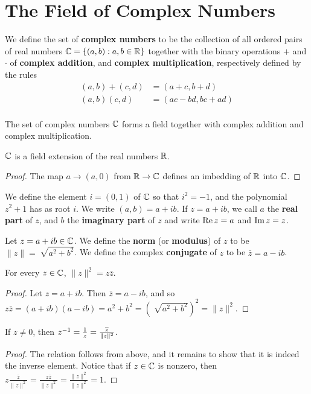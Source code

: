 \section{The Field of Complex Numbers}

\begin{definition}
    We define the set of \textbf{complex numbers} to be the collection of all
    ordered pairs of real numbers $\mathbb{C}=\{(a,b) : a,b \in \mathbb{R}\}$ together with the
    binary operations $+$ and  $\cdot$ of  \textbf{complex addition}, and
    \textbf{complex multiplication}, respectively defined by the rules
    \begin{align*}
        (a,b)+(c,d) &=  (a+c,b+d)   \\
        (a,b)(c,d)  &=  (ac-bd,bc+ad)   \\
    \end{align*}
\end{definition}

\begin{theorem}\label{1.1.1}
    The set of complex numbers $\mathbb{C}$ forms a field together with complex addition
    and complex multiplication.
\end{theorem}
\begin{corollary}
    $\mathbb{C}$ is a field extension of the real numbers $\mathbb{R}$.
\end{corollary}
\begin{proof}
    The map $a \xrightarrow{} (a,0)$ from $\mathbb{R} \xrightarrow{} \mathbb{C}$ defines an
    imbedding of $\mathbb{R}$ into  $\mathbb{C}$.
\end{proof}

\begin{definition}
    We define the element $i=(0,1)$ of $\mathbb{C}$ so that  $i^2=-1$, and the
    polynomial $z^2+1$ has as root $i$. We write $(a,b)=a+ib$. If $z=a+ib$, we
    call  $a$ the  \textbf{real part} of $z$, and  $b$ the  \textbf{imaginary
    part} of $z$ and write  $\operatorname{Re}{z}=a$ and $\operatorname{Im}{z}=z$.
\end{definition}

\begin{definition}
    Let $z=a+ib \in \mathbb{C}$. We define the \textbf{norm} (or \textbf{modulus}) of
    $z$ to be  $\|z\|=\sqrt[]{a^2+b^2}$. We define the complex
    \textbf{conjugate} of $z$ to be  $\bar{z}=a-ib$.
\end{definition}

\begin{lemma}\label{1.1.2}
    For every $z \in \mathbb{C}$,  $\|z\|^2=z\bar{z}$.
\end{lemma}
\begin{proof}
    Let $z=a+ib$. Then $\bar{z}=a-ib$, and so
    $z\bar{z}=(a+ib)(a-ib)=a^2+b^2=(\sqrt[]{a^2+b^2})^2=\|z\|^2$.
\end{proof}
\begin{corollary}
    If $z \neq 0$, then $z^{-1}=\frac{1}{z}=\frac{\overline{z}}{\|z\|^2}$.
\end{corollary}
\begin{proof}
    The relation follows from above, and it remains to show that it is indeed
    the inverse element. Notice that if $z \in \mathbb{C}$ is nonzero, then
    $z\frac{\bar{z}}{\|z\|^2}=\frac{z\bar{z}}{\|z\|^2}=\frac{\|z\|^2}{\|z\|^2}=1$.
\end{proof}

